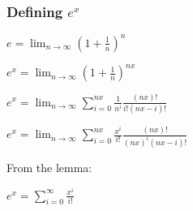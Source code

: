 \subsubsection{Defining \(e^x\)}

\(e=\lim_{n\rightarrow \infty }(1+\frac{1}{n})^{n}\)

\(e^x=\lim_{n\rightarrow \infty }(1+\frac{1}{n})^{nx}\)

$e^x=\lim_{n\rightarrow \infty }\sum^{nx}_{i=0} \frac{1}{n^i} \frac{(nx)!}{i!(nx-i)!}$

$e^x=\lim_{n\rightarrow \infty }\sum^{nx}_{i=0} \frac{x^i}{i!} \frac{(nx)!}{(nx)^i(nx-i)!}$

From the lemma:

$e^x=\sum^{\infty }_{i=0} \frac{x^i}{i!}$

